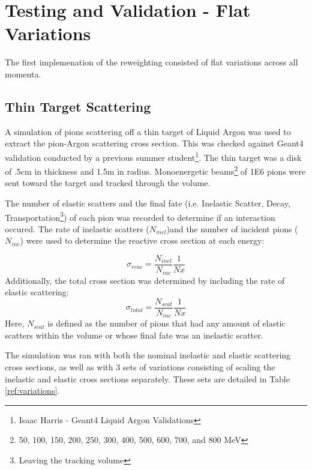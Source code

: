 \documentclass[12pt]{article}
\begin{document}
\section{Testing and Validation - Flat Variations}
The first implemenation of the reweighting consisted of flat variations across all momenta.


\subsection{Thin Target Scattering}
A simulation of pions scattering off a thin target of Liquid Argon was used to extract the pion-Argon scattering cross section. %
This was checked against Geant4 validation conducted by a previous summer student\footnote{Isaac Harris - Geant4 Liquid Argon Validations}.
The thin target was a disk of .5cm in thickness and 1.5m in radius. Monoenergetic beams\footnote{{50, 100, 150, 200, 250, 300, 400, 500, 600, 700, and 800} MeV } of 1E6 pions were sent toward the target and tracked through the volume. 

The number of elastic scatters and the final fate (i.e. Inelastic Scatter, Decay, Transportation\footnote{Leaving the tracking volume}) of each pion was recorded to determine if an interaction occured. The rate of inelastic scatters ($N_{inel}$)and the number of incident pions ($N_{inc}$) were used to determine the reactive cross section at each energy: 

\begin{equation}\label{ref:reactive_xsec}
\sigma_{reac} = \frac{N_{inel}}{N_{inc}}\frac{1}{Nx}
\end{equation}
Additionally, the total cross section was determined by including the rate of elastic scattering:
\begin{equation}\label{ref:total_xsec}
\sigma_{total} = \frac{N_{scat}}{N_{inc}}\frac{1}{Nx}
\end{equation}
Here, $N_{scat}$ is defined as the number of pions that had any amount of elastic scatters within the volume or whose final fate was an inelastic scatter. 

The simulation was ran with both the nominal inelastic and elastic scattering cross sections, as well as with 3 sets of variations consisting of scaling the inelastic and elastic cross sections separately. These sets are detailed in Table \ref{ref:variations}. 
\end{document}
